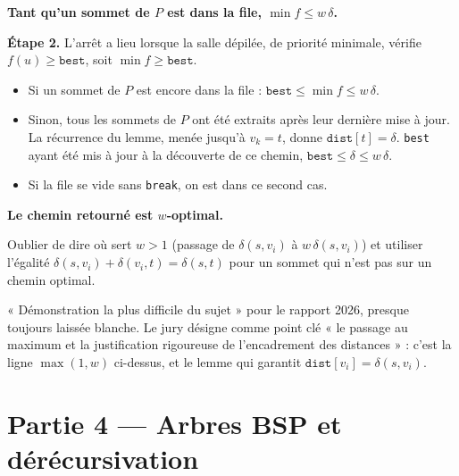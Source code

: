 \documentclass[11pt,a4paper]{article}
\providecommand{\tightlist}{\setlength{\itemsep}{0pt}\setlength{\parskip}{0pt}}
\newcommand{\equationajustee}[1]{%
  \sbox{\boiteequation}{$\displaystyle #1$}%
  \ifdim\wd\boiteequation>\linewidth
    \[\resizebox{\linewidth}{!}{\usebox{\boiteequation}}\]%
  \else
    \[#1\]%
  \fi}
\begin{document}
\textbf{Tant qu'un sommet de \(P\) est dans la file, \(\min f \le w\,\delta\).}

\textbf{Étape 2.} L'arrêt a lieu lorsque la salle dépilée, de priorité minimale, vérifie \(f(u) \ge \texttt{best}\), soit \(\min f \ge \texttt{best}\).

\begin{itemize}
\tightlist
\item
  Si un sommet de \(P\) est encore dans la file : \(\texttt{best} \le \min f \le w\,\delta\).
\item
  Sinon, tous les sommets de \(P\) ont été extraits après leur dernière mise à jour. La récurrence du lemme, menée jusqu'à \(v_k = t\), donne \(\texttt{dist}[t] = \delta\). \texttt{best} ayant été mis à jour à la découverte de ce chemin, \(\texttt{best} \le \delta \le w\,\delta\).
\item
  Si la file se vide sans \texttt{break}, on est dans ce second cas.
\end{itemize}

\equationajustee{\boxed{\texttt{best} \le w \cdot \delta(s,t)}}

\textbf{Le chemin retourné est \(w\)-optimal.}

\begin{piege}

Oublier de dire où sert \(w > 1\) (passage de \(\delta(s,v_i)\) à \(w\,\delta(s,v_i)\)) et utiliser l'égalité \(\delta(s,v_i) + \delta(v_i,t) = \delta(s,t)\) pour un sommet qui n'est pas sur un chemin optimal.

\end{piege}

\begin{jury}

« Démonstration la plus difficile du sujet » pour le rapport 2026, presque toujours laissée blanche. Le jury désigne comme point clé « le passage au maximum et la justification rigoureuse de l'encadrement des distances » : c'est la ligne \(\max(1,w)\) ci-dessus, et le lemme qui garantit \(\texttt{dist}[v_i] = \delta(s,v_i)\).

\end{jury}

\hypertarget{partie-4-arbres-bsp-et-duxe9ruxe9cursivation}{%
\section{Partie 4 --- Arbres BSP et dérécursivation}\label{partie-4-arbres-bsp-et-duxe9ruxe9cursivation}}
\end{document}
